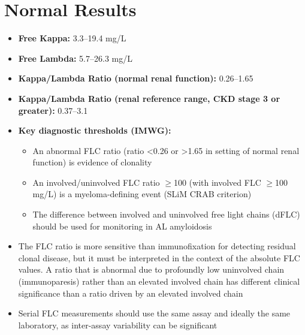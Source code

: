 \section*{Normal Results}
\begin{itemize}
  \item \textbf{Free Kappa:} 3.3--19.4 mg/L
  \item \textbf{Free Lambda:} 5.7--26.3 mg/L
  \item \textbf{Kappa/Lambda Ratio (normal renal function):} 0.26--1.65
  \item \textbf{Kappa/Lambda Ratio (renal reference range, CKD stage 3 or greater):} 0.37--3.1
  \item \textbf{Key diagnostic thresholds (IMWG):}
  \begin{itemize}
    \item An abnormal FLC ratio (ratio <0.26 or >1.65 in setting of normal renal function) is evidence of clonality
    \item An involved/uninvolved FLC ratio $\geq$100 (with involved FLC $\geq$100 mg/L) is a myeloma-defining event (SLiM CRAB criterion)
    \item The difference between involved and uninvolved free light chains (dFLC) should be used for monitoring in AL amyloidosis
  \end{itemize}
  \item The FLC ratio is more sensitive than immunofixation for detecting residual clonal disease, but it must be interpreted in the context of the absolute FLC values. A ratio that is abnormal due to profoundly low uninvolved chain (immunoparesis) rather than an elevated involved chain has different clinical significance than a ratio driven by an elevated involved chain
  \item Serial FLC measurements should use the same assay and ideally the same laboratory, as inter-assay variability can be significant
\end{itemize}

